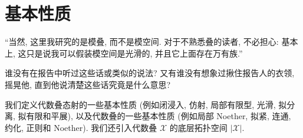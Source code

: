 \section{基本性质}\label{src:4.3-section}
\begin{epigraph}
``当然, 这里我研究的是模叠, 而不是模空间. 对于不熟悉叠的读者, 不必担心: 基本上, 这只是说我可以假装模空间是光滑的, 并且它上面存在万有族.''

谁没有在报告中听过这些话或类似的说法? 又有谁没有想象过揪住报告人的衣领, 摇晃他, 直到他说清楚这些话究竟是什么意思?
\end{epigraph}
我们定义代数叠态射的一些基本性质 (例如闭浸入, 仿射, 局部有限型, 光滑, 拟分离, 拟有限和平展), 以及代数叠的一些基本性质 (例如局部 Noether, 拟紧, 连通, 约化, 正则和 Noether). 我们还引入代数叠 $\mathcal X$ 的底层拓扑空间 $|\mathcal X|$.
